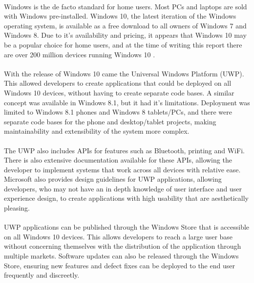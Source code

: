 		\paragraph{}{
		Windows is the de facto standard for home users. Most PCs and laptops are sold with Windows pre-installed. Windows 10, the latest iteration of the Windows operating system, is available as a free download to all owners of Windows 7 and Windows 8. Due to it's availability and pricing, it appears that Windows 10 may be a popular choice for home users, and at the time of writing this report there are over 200 million devices running Windows 10 \cite{Win10Nums}.
		}
		\paragraph{}{
		With the release of Windows 10 came the Universal Windows Platform (UWP). This allowed developers to create applications that could be deployed on all Windows 10 devices, without having to create separate code bases. A similar concept was available in Windows 8.1, but it had it's limitations. Deployment was limited to Windows 8.1 phones and Windows 8 tablets/PCs, and there were separate code bases for the phone and desktop/tablet projects, making maintainability and extensibility of the system more complex.
		}
		\paragraph{}{
		The UWP also includes APIs for features such as Bluetooth, printing and WiFi. There is also extensive documentation available for these APIs, allowing the developer to implement systems that work across all devices with relative ease. Microsoft also provides design guidelines for UWP applications, allowing developers, who may not have an in depth knowledge of user interface and user experience design, to create applications with high usability that are aesthetically pleasing.
		}
		\paragraph{}{
		UWP applications can be published through the Windows Store that is accessible on all Windows 10 devices. This allows developers to reach a large user base without concerning themselves with the distribution of the application through multiple markets. Software updates can also be released through the Windows Store, ensuring new features and defect fixes can be deployed to the end user frequently and discreetly.
		}	
		
